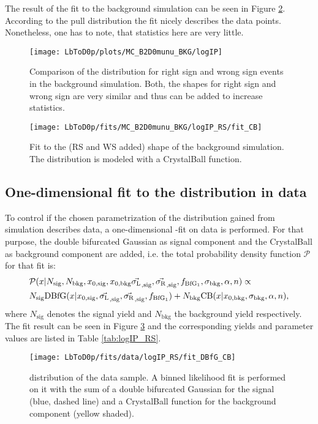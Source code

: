 The result of the fit to the background simulation can be seen in Figure \ref{fig:fit_logIP_MC_BKG}.
According to the pull distribution the fit nicely describes the data points.
Nonetheless, one has to note, that statistics here are very little.
\begin{figure}[tb]
    \centering
	\texttt{[image: LbToD0p/plots/MC\_B2D0munu\_BKG/logIP]}
	\caption{Comparison of the \logIP distribution for right sign and wrong sign events in the background simulation. Both, the shapes for right sign and wrong sign are very similar and thus can be added to increase statistics.}
    \label{fig:plot_logIP_MC_BKG}
\end{figure}
\begin{figure}[tb]
    \centering
	\texttt{[image: LbToD0p/fits/MC\_B2D0munu\_BKG/logIP\_RS/fit\_CB]}
	\caption{Fit to the (RS and WS added) \logIP shape of the background simulation.
             The distribution is modeled with a CrystalBall function.}
    \label{fig:fit_logIP_MC_BKG}
\end{figure}

\subsection{One-dimensional fit to the \logIP distribution in data}
\label{sec:ControlLogIP}
To control if the chosen parametrization of the \logIP distribution gained from simulation describes data, a one-dimensional \logIP-fit on data is performed.
For that purpose, the double bifurcated Gaussian as signal component and the CrystalBall as background component are added, i.e. the total probability density function $\mathcal{P}$ for that fit is:
\begin{align}
    &\mathcal{P}(x|N_\text{sig}, N_\text{bkg}, x_{0, \text{sig}}, x_{0, \text{bkg}} \vec{\sigma_{\text{L}_{}}}_{,\text{sig}}, \vec{\sigma_{\text{R}_{}}}_{,\text{sig}}, f_{\text{BfG}_1}, \sigma_\text{bkg}, \alpha, n) \propto \nonumber\\
    &N_\text{sig} \text{DBfG}(x|x_{0, \text{sig}}, \vec{\sigma_{\text{L}_{}}}_{,\text{sig}}, \vec{\sigma_{\text{R}_{}}}_{,\text{sig}}, f_{\text{BfG}_1}) + N_\text{bkg} \text{CB}(x| x_{0, \text{bkg}}, \sigma_\text{bkg}, \alpha, n),
\end{align}
where $N_\text{sig}$ denotes the signal yield and $N_\text{bkg}$ the background yield respectively.
The fit result can be seen in Figure \ref{fig:fit_logIP_RS} and the corresponding yields and parameter values are listed in Table \ref{tab:logIP_RS}.
\begin{figure}[tb]
    \centering
	\texttt{[image: LbToD0p/fits/data/logIP\_RS/fit\_DBfG\_CB]}
	\caption{\logIP distribution of the data sample.
             A binned likelihood fit is performed on it with the sum of a double bifurcated Gaussian for the signal (blue, dashed line) and a CrystalBall function for the background component (yellow shaded). }
    \label{fig:fit_logIP_RS}
\end{figure}


